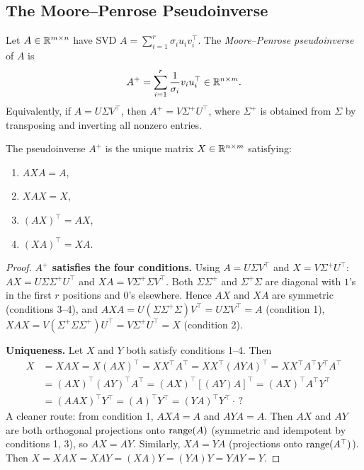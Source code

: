 \documentclass[11pt,a4paper]{article}
\begin{document}
\subsection{The Moore--Penrose Pseudoinverse}

\begin{definition}
\label{def:pseudoinverse}
Let $A \in \mathbb{R}^{m \times n}$ have SVD
$A = \sum_{i=1}^r \sigma_i u_i v_i^\top$.  The \emph{Moore--Penrose
pseudoinverse} of $A$ is
\[
  A^+ = \sum_{i=1}^r \frac{1}{\sigma_i} v_i u_i^\top \in \mathbb{R}^{n \times m}.
\]
Equivalently, if $A = U\Sigma V^\top$, then
$A^+ = V\Sigma^+ U^\top$, where $\Sigma^+$ is obtained from $\Sigma$
by transposing and inverting all nonzero entries.
\end{definition}

\begin{theorem}
\label{thm:penrose}
The pseudoinverse $A^+$ is the unique matrix $X \in \mathbb{R}^{n \times m}$
satisfying:
\begin{enumerate}[nosep]
  \item $AXA = A$,
  \item $XAX = X$,
  \item $(AX)^\top = AX$,
  \item $(XA)^\top = XA$.
\end{enumerate}
\end{theorem}

\begin{proof}
\textbf{$A^+$ satisfies the four conditions.}
Using $A = U\Sigma V^\top$ and $X = V\Sigma^+ U^\top$:
$AX = U\Sigma\Sigma^+ U^\top$ and $XA = V\Sigma^+\Sigma V^\top$.
Both $\Sigma\Sigma^+$ and $\Sigma^+\Sigma$ are diagonal with $1$'s
in the first $r$ positions and $0$'s elsewhere.  Hence $AX$ and $XA$
are symmetric (conditions 3--4), and $AXA = U(\Sigma\Sigma^+\Sigma)V^\top
= U\Sigma V^\top = A$ (condition 1), $XAX = V(\Sigma^+\Sigma\Sigma^+)U^\top
= V\Sigma^+ U^\top = X$ (condition 2).

\textbf{Uniqueness.}
Let $X$ and $Y$ both satisfy conditions 1--4.  Then
\begin{align*}
  X &= XAX = X(AX)^\top = XX^\top A^\top = XX^\top(AYA)^\top
  = XX^\top A^\top Y^\top A^\top \\
  &= (AX)^\top (AY)^\top A^\top = (AX)^\top [(AY)A]^\top
  = (AX)^\top A^\top Y^\top \\
  &= (AAX)^\top Y^\top = (A)^\top Y^\top = (YA)^\top Y^\top \cdot\,\text{?}
\end{align*}
A cleaner route: from condition 1, $AXA = A$ and $AYA = A$.  Then
$AX$ and $AY$ are both orthogonal projections onto $\operatorname{range}(A)$ (symmetric
and idempotent by conditions 1, 3), so $AX = AY$.  Similarly, $XA = YA$
(projections onto $\operatorname{range}(A^\top)$).  Then
$X = XAX = XAY = (XA)Y = (YA)Y = YAY = Y$.
\end{proof}
\end{document}
